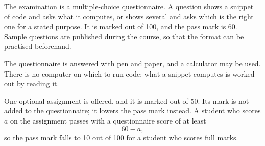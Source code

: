 The examination is a multiple-choice questionnaire.
A question shows a snippet of code and asks what it computes,
or shows several and asks which is the right one for a stated purpose.
It is marked out of 100, and the pass mark is 60.
Sample questions are published during the course,
so that the format can be practised beforehand.

The questionnaire is answered with pen and paper,
and a calculator may be used.
There is no computer on which to run code:
what a snippet computes is worked out by reading it.

One optional assignment is offered, and it is marked out of 50.
Its mark is not added to the questionnaire;
it lowers the pass mark instead.
A student who scores $a$ on the assignment
passes with a questionnaire score of at least
\begin{equation}\label{eq.passMark}
 60 - a ,
\end{equation}
so the pass mark falls to 10 out of 100 for a student who scores full marks.
